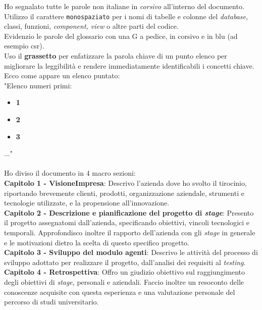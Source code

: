Ho segnalato tutte le parole non italiane in \textit{corsivo} all'interno del documento.\\
Utilizzo il carattere \texttt{monospaziato} per i nomi di tabelle e colonne del \textit{database}, 
classi, funzioni, \textit{component, view} o altre parti del codice.\\
Evidenzio le parole del glossario con una G a pedice, in corsivo e in blu (ad esempio \gls{csr}).\\
Uso il \textbf{grassetto} per enfatizzare la parola chiave di un punto elenco 
per migliorare la leggibilità e rendere immediatamente identificabili i concetti chiave.\\
Ecco come appare un elenco puntato:\\
"Elenco numeri primi:
\begin{itemize}
\item \textbf{1}
\item \textbf{2}
\item \textbf{3}
\end{itemize}
..."\\\\
Ho diviso il documento in 4 macro sezioni:\\
\textbf{Capitolo 1 - VisioneImpresa}: Descrivo l'azienda dove ho svolto il tirocinio, riportando brevemente clienti, 
prodotti, organizzazione aziendale, strumenti e tecnologie utilizzate, e la propensione all'innovazione.\\
\textbf{Capitolo 2 - Descrizione e pianificazione del progetto di \textit{stage}}: Presento il progetto assegnatomi dall'azienda, specificando 
obiettivi, vincoli tecnologici e temporali. Approfondisco inoltre il rapporto dell'azienda con gli \textit{stage} in generale e 
le motivazioni dietro la scelta di questo specifico progetto.\\
\textbf{Capitolo 3 - Sviluppo del modulo agenti}: Descrivo le attività del processo di sviluppo adottato per realizzare il progetto, 
dall'analisi dei requisiti al \textit{testing}.\\
\textbf{Capitolo 4 - Retrospettiva}: Offro un giudizio obiettivo sul raggiungimento degli obiettivi di \textit{stage}, 
personali e aziendali. Faccio inoltre un resoconto delle conoscenze acquisite con questa esperienza e una valutazione 
personale del percorso di studi universitario.

\endgroup
\vfill
